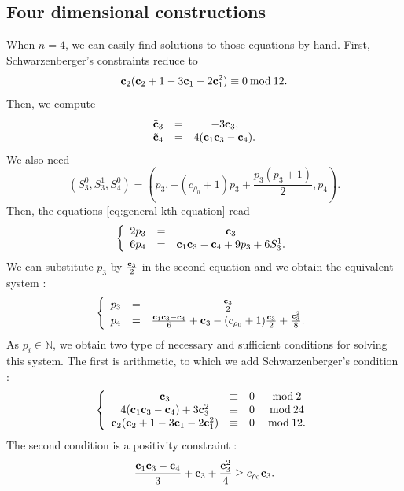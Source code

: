\documentclass[a4paper,10pt]{amsart}
\theoremstyle{plain}{
    \newtheorem{theorem}{Theorem}[section]
    \newtheorem{lemma}[theorem]{Lemma}
    \newtheorem{corollary}[theorem]{Corollary}
    \newtheorem{proposition}[theorem]{Proposition}
    \newtheorem{conjecture}[theorem]{Conjecture}
}
\theoremstyle{definition}{
    \newtheorem{definition}[theorem]{Definition}
    \newtheorem{defn-thm}[theorem]{Definition-Theorem}
    \newtheorem{example}[theorem]{Example}
    \newtheorem{notation}[theorem]{Notation}
}
\theoremstyle{remark}{
    \newtheorem{remark}[theorem]{Remark}
    \newtheorem{problem}[theorem]{Problem}
    \newtheorem{question}[theorem]{Question}
}
\def\uc{{\bf c}}
\def\N{\mathbb{N}}
\begin{document}
\subsection{Four dimensional constructions}
\label{sec:P4}
When $n=4$, we can  easily find solutions to those equations by hand. First, Schwarzenberger's constraints reduce to
$$
\uc_2(\uc_2+1-3\uc_1-2\uc_1^2)\equiv 0 \: \mathrm{ mod }\: 12.
$$
Then, we compute 
$$
\begin{array}{ccc}
 \tilde\uc_3 & = & -3\uc_3, \\
 \tilde \uc_4 & = & 4(\uc_1\uc_3-\uc_4).
\end{array}
$$
We also need
$$
(S_3^0,S_3^1,S_4^0)=(p_3, -(c_{\rho_0}+1)p_3+\frac{p_3(p_3+1)}{2},p_4 ).
$$
Then, the equations \eqref{eq:general kth equation} read 
$$
\left\{
\begin{array}{ccc}
2p_3 & = & \uc_3 \\
6p_4 & = & \uc_1\uc_3-\uc_4 + 9 p_3 + 6 S_3^1.
\end{array}
\right.
$$
We can substitute $p_3$ by $\frac{\uc_3}{2}$ in the second equation and we obtain the equivalent system :
\begin{equation}
 \label{eq:P4 case equations pj}
\left\{
\begin{array}{ccc}
p_3 & = & \frac{\uc_3}{2} \\
p_4 & = & \frac{\uc_1\uc_3-\uc_4}{6}+\uc_3-(c_{\rho_0}+1)\frac{\uc_3}{2}+\frac{\uc_3^2}{8}.
\end{array}
\right.
\end{equation}
As $p_i\in\N$, we obtain two type of necessary and sufficient conditions for solving this system. The first is arithmetic, to which we add Schwarzenberger's condition :
\begin{equation}
 \label{eq:P4 case arithmetic conditions}
 \left\{
\begin{array}{cccc}
\uc_3 & \equiv & 0 &\: \mathrm{ mod }\: 2\\
4(\uc_1\uc_3-\uc_4)+3\uc_3^2 & \equiv &0& \: \mathrm{ mod }\: 24\\
\uc_2(\uc_2+1-3\uc_1-2\uc_1^2) & \equiv & 0& \: \mathrm{ mod }\: 12.\\
\end{array}
\right. 
\end{equation}
The second condition is a positivity constraint :
\begin{equation}
 \label{eq:P4 case positivity}
 \frac{\uc_1\uc_3-\uc_4}{3}+\uc_3+\frac{\uc_3^2}{4}\geq c_{\rho_0}\uc_3.
\end{equation}
\end{document}
